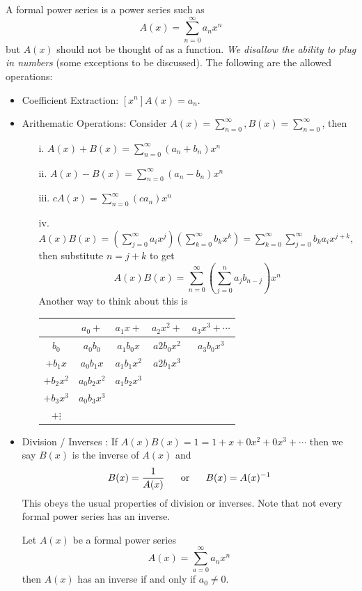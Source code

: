 \documentclass[english, 11pt]{article}
\begin{document}
   \begin{defn}\label{power series}
     A formal power series is a power series such as
     \[ A(x) = \sum_{n=0}^{\infty} a_nx^n \]
     but $A(x)$ should not be thought of as a function. \textit{We disallow the ability to plug in numbers} (some exceptions to be discussed). The following are the allowed operations:
     \begin{itemize}
       \item Coefficient Extraction: $[x^n]A(x) = a_n$.
       \item Arithematic Operations: Consider $A(x) = \sum_{n=0}^{\infty}, B(x) = \sum_{n=0}^{\infty}$, then
       \begin{itemize}
         \item[i.] $\displaystyle A(x) + B(x) =  \sum_{n=0}^{\infty} (a_n + b_n)x^n$
         \item[ii.] $\displaystyle A(x) - B(x) =  \sum_{n=0}^{\infty} (a_n - b_n)x^n$
         \item[iii.] $\displaystyle cA(x) =  \sum_{n=0}^{\infty} (ca_n)x^n$
         \item[iv.] $\displaystyle A(x)B(x) = \left( \sum_{j=0}^{\infty} a_ix^j\right)\left(  \sum_{k=0}^{\infty} b_kx^k \right) = \sum_{k=0}^{\infty}\sum_{j=0}^{\infty} b_ka_ix^{j+k}$, then substitute $n = j+k$ to get
         \[ A(x)B(x)= \sum_{n=0}^{\infty}\left(\sum_{j=0}^{n} a_jb_{n-j}\right)x^{n} \]
         Another way to think about this is \\
         \begin{center}
         \begin{tabular}{c || c | c | c | c}
           {} & $a_0 +$ & $a_1x +$ & $a_2x^2 +$ & $a_3x^3 + \cdots$ \\
           \hline
           \hline
           $b_0$ & $a_0b_0$ & $a_1b_0x$ & $a2b_0x^2$ & $a_3b_0x^3$ \\
           \hline
           $+b_1x$ & $a_0b_1x$ & $a_1b_1x^2$ & $a2b_1x^3$ \\
           \hline
           $+b_2x^2$ & $a_0b_2x^2$ & $a_1b_2x^3$ \\
           \hline
           $+b_3x^3$ & $a_0b_3x^3$ \\
           \hline
           $+\vdots$
         \end{tabular}
         \end{center}
       \end{itemize}
       \item Division / Inverses : If $A(x)B(x)= 1 = 1 + x + 0x^2 + 0x^3 + \cdots$ then we say $B(x)$ is the inverse of $A(x)$ and
       \[ B(x) = \f{1}{A(x)} \mbox{ \ \ \ \ or \ \ \ \ } B(x) = A(x)^{-1} \]
       This obeys the usual properties of division or inverses. Note that not every formal power series has an inverse.
        \begin{thrm}
     Let $A(x)$ be a formal power series
     \[ A(x) = \sum_{a=0}^{\infty} a_nx^n \]
     then $A(x)$ has an inverse if and only if $a_0 \not = 0$.
   \end{thrm}


\end{itemize}
\end{defn}
\end{document}
